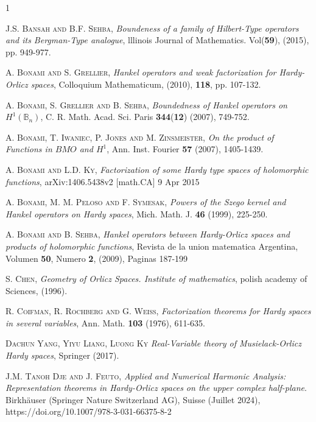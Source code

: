 \documentclass[a4paper,12pt,intlimits,oneside]{amsart}
\theoremstyle{definition}
\numberwithin{equation}{section}
\theoremstyle{definition}
\begin{document}

 \begin{thebibliography}{1}
 
 	\textsc{J.S. Bansah and B.F. Sehba}, \emph{Boundeness of a family of Hilbert-Type operators and its Bergman-Type analogue}, lllinois Journal of Mathematics. Vol(\textbf{59}), (2015),  pp. 949-977.
 

    \textsc{A. Bonami and S. Grellier}, \emph{Hankel operators and weak factorization for Hardy-Orlicz spaces}, Colloquium Mathematicum, (2010), \textbf{118}, pp. 107-132. 

    \textsc{A. Bonami, S. Grellier and B. Sehba}, \emph{Boundedness of Hankel operators on $H^{1}(\mathbb{B}_{n})$}, C. R. Math. Acad. Sci. Paris\textbf{ 344}(\textbf{12}) (2007), 749-752.


 
   \textsc{A. Bonami, T. Iwaniec, P. Jones and M. Zinsmeister}, \emph{On the product of Functions in
   $BMO$ and $H^{1}$}, Ann. Inst. Fourier \textbf{57} (2007), 1405-1439. 

    \textsc{A. Bonami and L.D. Ky}, \emph{Factorization of some Hardy type spaces of holomorphic functions}, arXiv:1406.5438v2 [math.CA] 9 Apr 2015

   
    \textsc{A. Bonami, M. M. Peloso and F. Symesak}, \emph{Powers of the Szego kernel and Hankel operators
    on Hardy spaces}, Mich. Math. J. \textbf{46} (1999), 225-250.
 

    \textsc{A. Bonami and B. Sehba}, \emph{Hankel operators between Hardy-Orlicz spaces and products of holomorphic functions}, Revista de la union matematica Argentina, Volumen \textbf{50}, Numero \textbf{2}, (2009), Paginas 187-199


   \textsc{S. Chen}, \emph{Geometry of Orlicz Spaces. Institute of mathematics}, polish academy of Sciences, (1996).


   \textsc{R. Coifman, R. Rochberg and G. Weiss}, \emph{Factorization theorems for Hardy spaces in several variables}, Ann. Math. \textbf{103} (1976), 611-635.
 
 \textsc{Dachun Yang, Yiyu Liang, Luong Ky}
   \emph{Real-Variable theory of Musielack-Orlicz Hardy spaces}, Springer (2017).  
   
       \textsc{J.M. Tanoh Dje and J. Feuto}, \emph{Applied and Numerical Harmonic Analysis: Representation theorems in
       Hardy-Orlicz spaces on the upper complex
       half-plane}. Birkhäuser (Springer Nature Switzerland AG), Suisse (Juillet 2024),  https://doi.org/10.1007/978-3-031-66375-8-2
       

\end{thebibliography}
\end{document}
